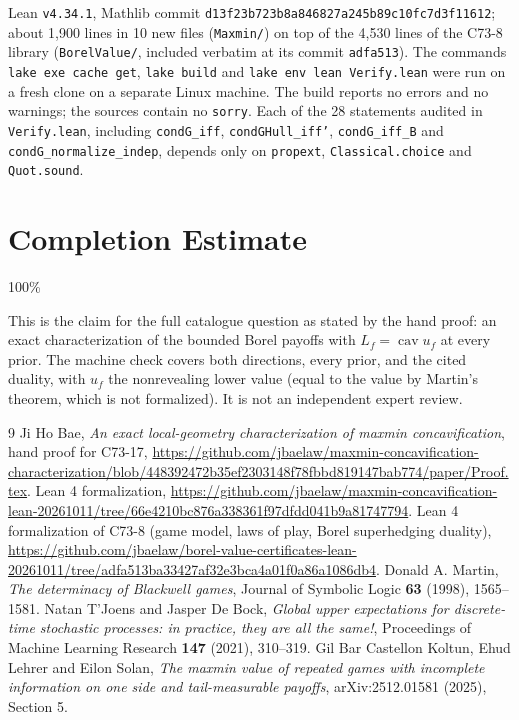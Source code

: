 \documentclass[11pt]{article}
\theoremstyle{definition}
\begin{document}
Lean \texttt{v4.34.1}, Mathlib commit \texttt{d13f23b723b8a846827a245b89c10fc7d3f11612}; about 1,900 lines in 10 new files (\texttt{Maxmin/}) on top of the 4,530 lines of the C73-8 library (\texttt{BorelValue/}, included verbatim at its commit \texttt{adfa513}). The commands \texttt{lake exe cache get}, \texttt{lake build} and \texttt{lake env lean Verify.lean} were run on a fresh clone on a separate Linux machine. The build reports no errors and no warnings; the sources contain no \texttt{sorry}. Each of the 28 statements audited in \texttt{Verify.lean}, including \texttt{condG\_iff}, \texttt{condGHull\_iff'}, \texttt{condG\_iff\_B} and \texttt{condG\_normalize\_indep}, depends only on \texttt{propext}, \texttt{Classical.choice} and \texttt{Quot.sound}.

\section*{Completion Estimate}
100\%

This is the claim for the full catalogue question as stated by the hand proof: an exact characterization of the bounded Borel payoffs with $L_f=\operatorname{cav}u_f$ at every prior. The machine check covers both directions, every prior, and the cited duality, with $u_f$ the nonrevealing lower value (equal to the value by Martin's theorem, which is not formalized). It is not an independent expert review.

\begin{thebibliography}{9}
 Ji Ho Bae, \emph{An exact local-geometry characterization of maxmin concavification}, hand proof for C73-17, \url{https://github.com/jbaelaw/maxmin-concavification-characterization/blob/448392472b35ef2303148f78fbbd819147bab774/paper/Proof.tex}.
 Lean 4 formalization, \url{https://github.com/jbaelaw/maxmin-concavification-lean-20261011/tree/66e4210bc876a338361f97dfdd041b9a81747794}.
 Lean 4 formalization of C73-8 (game model, laws of play, Borel superhedging duality), \url{https://github.com/jbaelaw/borel-value-certificates-lean-20261011/tree/adfa513ba33427af32e3bca4a01f0a86a1086db4}.
 Donald A. Martin, \emph{The determinacy of Blackwell games}, Journal of Symbolic Logic \textbf{63} (1998), 1565--1581.
 Natan T'Joens and Jasper De Bock, \emph{Global upper expectations for discrete-time stochastic processes: in practice, they are all the same!}, Proceedings of Machine Learning Research \textbf{147} (2021), 310--319.
 Gil Bar Castellon Koltun, Ehud Lehrer and Eilon Solan, \emph{The maxmin value of repeated games with incomplete information on one side and tail-measurable payoffs}, arXiv:2512.01581 (2025), Section 5.
\end{thebibliography}
\end{document}
